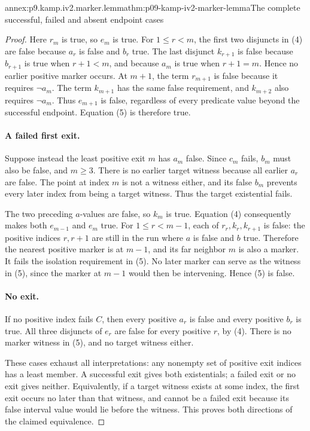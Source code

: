 \begin{annexitem}{annex:p9.kamp.iv2.marker.lemma}{thm:p09-kamp-iv2-marker-lemma}{The complete successful, failed and absent endpoint cases}
\begin{proof}
Here \(r_m\) is true, so \(e_m\) is true. For
\(1\leq r<m\), the first two disjuncts in (4) are
false because \(a_r\) is false and \(b_r\) true.
The last disjunct \(k_{r+1}\) is false because
\(b_{r+1}\) is true when \(r+1<m\), and because
\(a_m\) is true when \(r+1=m\). Hence no earlier
positive marker occurs. At \(m+1\), the term
\(r_{m+1}\) is false because it requires
\(\neg a_m\). The term \(k_{m+1}\) has the same
false requirement, and \(k_{m+2}\) also requires
\(\neg a_m\). Thus \(e_{m+1}\) is false, regardless
of every predicate value beyond the successful endpoint.
Equation (5) is therefore true.

\paragraph{A failed first exit.}
Suppose instead the least positive exit \(m\) has
\(a_m\) false. Since \(c_m\) fails, \(b_m\) must
also be false, and \(m\geq3\). There is no earlier
target witness because all earlier \(a_r\) are false.
The point at index \(m\) is not a witness either, and
its false \(b_m\) prevents every later index from
being a target witness. Thus the target existential fails.

The two preceding \(a\)-values are false, so
\(k_m\) is true. Equation (4) consequently makes
both \(e_{m-1}\) and \(e_m\) true. For
\(1\leq r<m-1\), each of \(r_r,k_r,k_{r+1}\)
is false: the positive indices \(r,r+1\) are still
in the run where \(a\) is false and \(b\) true.
Therefore the nearest positive marker is at \(m-1\),
and its far neighbor \(m\) is also a marker. It fails
the isolation requirement in (5). No later marker can
serve as the witness in (5), since the marker at
\(m-1\) would then be intervening. Hence (5) is false.

\paragraph{No exit.}
If no positive index fails \(C\), then every positive
\(a_r\) is false and every positive \(b_r\) is true.
All three disjuncts of \(e_r\) are false for every
positive \(r\), by (4). There is no marker witness
in (5), and no target witness either.

These cases exhaust all interpretations: any nonempty set
of positive exit indices has a least member. A successful
exit gives both existentials; a failed exit or no exit gives
neither. Equivalently, if a target witness exists at some
index, the first exit occurs no later than that witness,
and cannot be a failed exit because its false interval
value would lie before the witness. This proves both
directions of the claimed equivalence.


\end{proof}
\end{annexitem}
